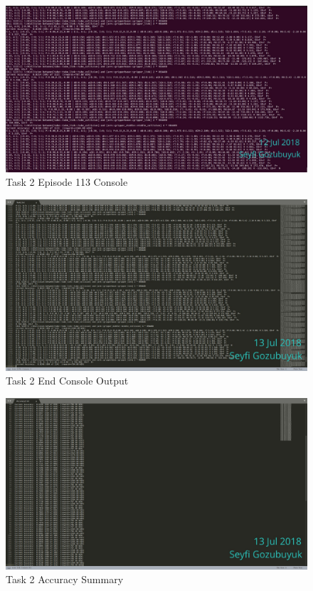 \documentclass[10pt,journal,compsoc]{IEEEtran}
\begin{document}
\begin{figure}[thpb]
      \centering
      \includegraphics[width=\linewidth]{figures/Task2_Step113_2.png}
      \caption{Task 2 Episode 113 Console}
      \label{fig:t2s1132}
\end{figure}


\begin{figure}[thpb]
      \centering
      \includegraphics[width=\linewidth]{figures/Task2EndConsole.png}
      \caption{Task 2 End Console Output}
      \label{fig:t2ec}
\end{figure}

\begin{figure}[thpb]
      \centering
      \includegraphics[width=\linewidth]{figures/Task2EndAcc.png}
      \caption{Task 2 Accuracy Summary}
      \label{fig:t2as}
\end{figure}
\end{document}
